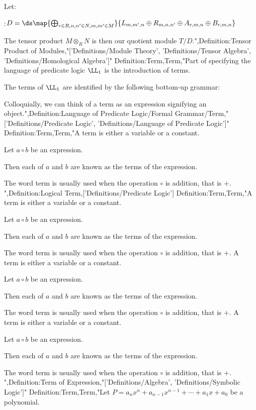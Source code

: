Let:

:$D = \ds \map {\bigoplus_{r \in R, n, n' \in N, m, m' \in M} } {L_{m, m', n} \oplus R_{m, n, n'} \oplus A_{r, m, n} \oplus B_{r, m, n} }$

The tensor product $M \otimes_R N$ is then our quotient module $T / D$.",Definition:Tensor Product of Modules,"['Definitions/Module Theory', 'Definitions/Tensor Algebra', 'Definitions/Homological Algebra']"
Definition:Term,Term,"Part of specifying the language of predicate logic $\LL_1$ is the introduction of terms.


The terms of $\LL_1$ are identified by the following bottom-up grammar:






Colloquially, we can think of a term as an expression signifying an object.",Definition:Language of Predicate Logic/Formal Grammar/Term,"['Definitions/Predicate Logic', 'Definitions/Language of Predicate Logic']"
Definition:Term,Term,"A term is either a variable or a constant.


Let $a \circ b$ be an expression.

Then each of $a$ and $b$ are known as the terms of the expression.


The word term is usually used when the operation $\circ$ is addition, that is $+$.
",Definition:Logical Term,['Definitions/Predicate Logic']
Definition:Term,Term,"A term is either a variable or a constant.


Let $a \circ b$ be an expression.

Then each of $a$ and $b$ are known as the terms of the expression.


The word term is usually used when the operation $\circ$ is addition, that is $+$.
A term is either a variable or a constant.


Let $a \circ b$ be an expression.

Then each of $a$ and $b$ are known as the terms of the expression.


The word term is usually used when the operation $\circ$ is addition, that is $+$.
A term is either a variable or a constant.


Let $a \circ b$ be an expression.

Then each of $a$ and $b$ are known as the terms of the expression.


The word term is usually used when the operation $\circ$ is addition, that is $+$.
",Definition:Term of Expression,"['Definitions/Algebra', 'Definitions/Symbolic Logic']"
Definition:Term,Term,"Let $P = a_n x^n + a_{n - 1} x^{n - 1} + \cdots + a_1 x + a_0$ be a polynomial.

